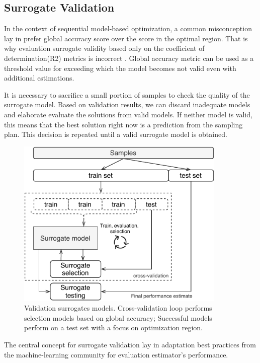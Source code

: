         \subsection{Surrogate Validation}
        In the context of sequential model-based optimization, a common misconception lay in prefer global accuracy score over the score in the optimal region. That is why evaluation surrogate validity based only on the coefficient of determination(R2) metrics is incorrect \cite{nardi2019practical}. Global accuracy metric can be used as a threshold value for exceeding which the model becomes not valid even with additional estimations. 

        It is necessary to sacrifice a small portion of samples to check the quality of the surrogate model. Based on validation results, we can discard inadequate models and elaborate evaluate the solutions from valid models. If neither model is valid, this means that the best solution right now is a prediction from the sampling plan. This decision is repeated until a valid surrogate model is obtained.


            \begin{figure}
                \centering
                \includegraphics[width=10cm]{content/images/cv}
                \caption[Cross-validation: exploration vs exploitation]{Validation surrogates models. Cross-validation loop performs selection models based on global accuracy; Successful models perform on a test set with a focus on optimization region.} 
                \label{fig:cv}   
            \end{figure}

        The central concept for surrogate validation lay in adaptation best practices from the machine-learning community for evaluation estimator's performance. 

